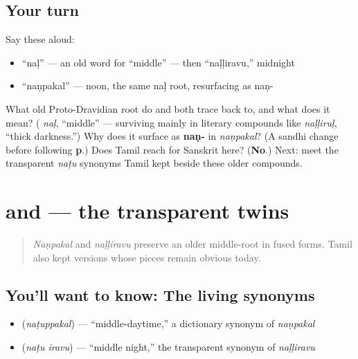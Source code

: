 \subsection*{Your turn}
Say these aloud:

\begin{itemize}
\raggedright
  \item \textquotedblleft{}naḷ\textquotedblright{} — an old word for \textquotedblleft{}middle\textquotedblright{} — then \textquotedblleft{}naḷḷiravu,\textquotedblright{} midnight
  \item \textquotedblleft{}naṇpakal\textquotedblright{} — noon, the same naḷ root, resurfacing as naṇ-
\end{itemize}

\begin{tcolorbox}[breakable,colback=teal!4,colframe=teal!35!black,title={Before you move on}]
What old Proto-Dravidian root do  and  both trace back to, and what does it mean? (\textbf{} \emph{naḷ}, \textquotedblleft{}middle\textquotedblright{} — surviving mainly in literary compounds like \emph{naḷḷiruḷ}, \textquotedblleft{}thick darkness.\textquotedblright{}) Why does it surface as \textbf{naṇ-} in \emph{naṇpakal}? (A sandhi change before following \textbf{p}.) Does Tamil reach for Sanskrit here? (\textbf{No}.) Next: meet the transparent \emph{naṭu} synonyms Tamil kept beside these older compounds.
\end{tcolorbox}
\section[\texorpdfstring{\ta{நடுப்பகல்}, \ta{நடு} \ta{இரவு} (naṭuppakal, naṭu …)}{நடுப்பகல், நடு இரவு (naṭuppakal, naṭu …)}]{ and   — the transparent twins}

\label{lesson:TA-C17-transparent-middle-synonyms}



\begin{quote}
\emph{Naṇpakal} and \emph{naḷḷiravu} preserve an older middle-root in fused forms. Tamil also kept versions whose pieces remain obvious today.
\end{quote}

\subsection*{You'll want to know: The living synonyms}
\begin{itemize}
\raggedright
  \item \textbf{} (\emph{naṭuppakal}) — \textquotedblleft{}middle-daytime,\textquotedblright{} a dictionary synonym of \emph{naṇpakal}
  \item \textbf{ } (\emph{naṭu iravu}) — \textquotedblleft{}middle night,\textquotedblright{} the transparent synonym of \emph{naḷḷiravu}
\end{itemize}

